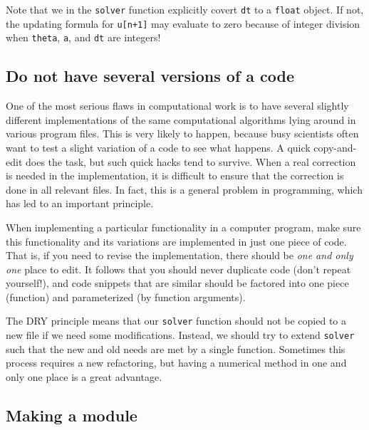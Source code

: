 \documentclass[%
oneside,                 %
final,                   %
10pt]{article}
\newenvironment{notice_mdfboxadmon}[1][]{
\begin{notice_mdfboxmdframed}[frametitle=#1]
}
{
\end{notice_mdfboxmdframed}
}
\begin{document}
\begin{notice_mdfboxadmon}
Note that we in the \texttt{solver} function explicitly covert \texttt{dt} to a
\texttt{float} object. If not, the updating formula for \texttt{u[n+1]} may evaluate
to zero because of integer division when \texttt{theta}, \texttt{a}, and \texttt{dt} are integers!
\end{notice_mdfboxadmon}



\subsection{Do not have several versions of a code}

One of the most serious flaws in computational work is to have several
slightly different implementations of the same computational algorithms
lying around in various program files. This is very likely to happen,
because busy scientists often want to test a slight variation of a code to see
what happens. A quick copy-and-edit does the task, but such quick hacks tend
to survive. When a real correction is needed in the implementation,
it is difficult to ensure that the correction is done in all relevant files.
In fact, this is a general problem in programming, which has led to
an important principle.


\begin{notice_mdfboxadmon}
When implementing a particular functionality in a computer program, make sure
this functionality and its variations are implemented in just one piece
of code. That is, if you need to revise the implementation, there should be
\emph{one and only one} place to edit. It follows that you should never
duplicate code (don't repeat yourself!), and code snippets that are
similar should be factored into one piece (function) and parameterized (by
function arguments).
\end{notice_mdfboxadmon}



The DRY principle means that our \texttt{solver} function should not be
copied to a new file if we need some modifications. Instead, we
should try to extend \texttt{solver} such that the new and old needs are
met by a single function. Sometimes this process requires a new
refactoring, but having a numerical method in one and only one place
is a great advantage.

\subsection{Making a module}
\label{softeng1:basic:module}
\end{document}
